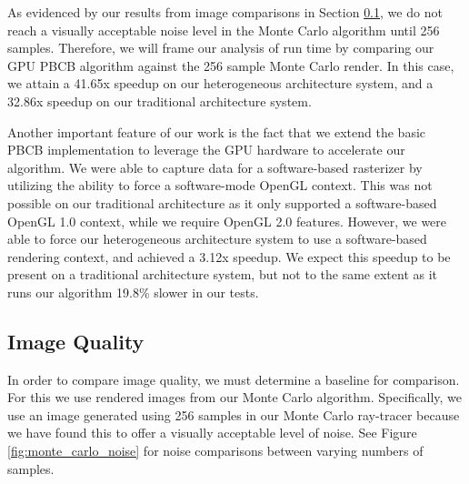 As evidenced by our results from image comparisons in Section \ref{sec:img_quality}, we do not reach a visually acceptable noise level in the Monte Carlo algorithm until 256 samples. Therefore, we will frame our analysis of run time by comparing our GPU PBCB algorithm against the 256 sample Monte Carlo render. In this case, we attain a 41.65x speedup on our heterogeneous architecture system, and a 32.86x speedup on our traditional architecture system.

Another important feature of our work is the fact that we extend the basic PBCB implementation to leverage the GPU hardware to accelerate our algorithm. We were able to capture data for a software-based rasterizer by utilizing the ability to force a software-mode OpenGL context. This was not possible on our traditional architecture as it only supported a software-based OpenGL 1.0 context, while we require OpenGL 2.0 features. However, we were able to force our heterogeneous architecture system to use a software-based rendering context, and achieved a 3.12x speedup. We expect this speedup to be present on a traditional architecture system, but not to the same extent as it runs our algorithm 19.8\% slower in our tests.

\subsection{Image Quality}
\label{sec:img_quality}
In order to compare image quality, we must determine a baseline for comparison. For this we use rendered images from our Monte Carlo algorithm. Specifically, we use an image generated using 256 samples in our Monte Carlo ray-tracer because we have found this to offer a visually acceptable level of noise. See Figure \ref{fig:monte_carlo_noise} for noise comparisons between varying numbers of samples.

